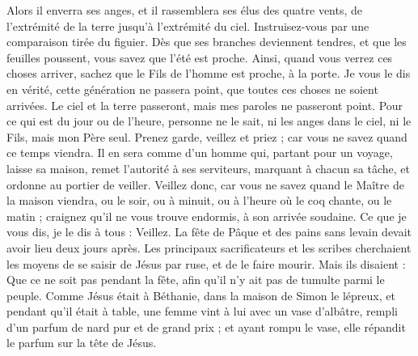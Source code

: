 \begin{multicols}{2}
Alors il enverra ses anges, et il rassemblera ses élus des quatre vents, de l’extrémité de la terre jusqu’à l’extrémité du ciel.
Instruisez-vous par une comparaison tirée du figuier. Dès que ses branches deviennent tendres, et que les feuilles poussent, vous savez que l'été est proche.
Ainsi, quand vous verrez ces choses arriver, sachez que le Fils de l’homme est proche, à la porte.
Je vous le dis en vérité, cette génération ne passera point, que toutes ces choses ne soient arrivées.
Le ciel et la terre passeront, mais mes paroles ne passeront point.
Pour ce qui est du jour ou de l’heure, personne ne le sait, ni les anges dans le ciel, ni le Fils{}, mais mon Père seul.
Prenez garde, veillez et priez ; car vous ne savez quand ce temps viendra.
Il en sera comme d’un homme qui, partant pour un voyage, laisse sa maison, remet l’autorité à ses serviteurs, marquant à chacun sa tâche, et ordonne au portier de veiller.
Veillez donc, car vous ne savez quand le Maître de la maison viendra, ou le soir, ou à minuit, ou à l'heure où le coq chante, ou le matin ;
craignez qu’il ne vous trouve endormis, à son arrivée soudaine.
Ce que je vous dis, je le dis à tous : Veillez.
\VerseOne{}La fête de Pâque et des pains sans levain devait avoir lieu deux jours après. Les principaux sacrificateurs et les scribes cherchaient les moyens de se saisir de Jésus par ruse, et de le faire mourir.
Mais ils disaient : Que ce ne soit pas pendant la fête, afin qu'il n’y ait pas de tumulte parmi le peuple.
Comme Jésus était à Béthanie, dans la maison de Simon le lépreux, et pendant qu’il était à table, une femme vint à lui avec un vase d'albâtre, rempli d'un parfum de nard pur et de grand prix ; et ayant rompu le vase, elle répandit le parfum sur la tête de Jésus.

\end{multicols}
